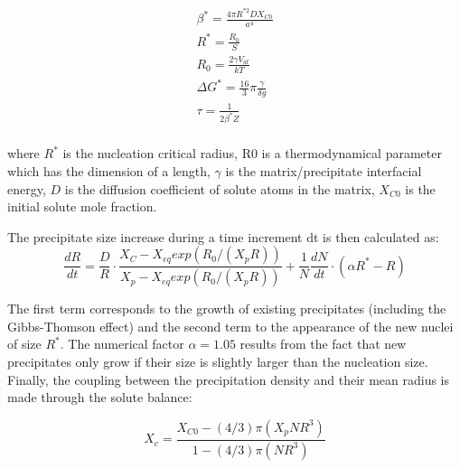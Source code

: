 \documentclass[12pt,a4paper]{article}
\begin{document}
\begin{subequations}
	\begin{align}
\beta^* = \frac{4\pi R^{*2} D X_{C0}}{a^4} \\
R^* = \frac{R_0}{S} \\
R_0 = \frac{2\gamma V_{at}}{kT} \\
\Delta G^* = \frac{16}{3}\pi \frac{\gamma}{\delta g} \\
\tau = \frac{1}{2\beta^* Z} \\
	\end{align}
	
\end{subequations}

where $R^*$ is the nucleation critical radius, R0 is a thermodynamical parameter
which has the dimension of a length, $\gamma$ is the matrix/precipitate interfacial energy, $D$ is the diffusion coefficient of solute atoms in the matrix, $X_{C0}$ is the initial solute mole fraction.

The precipitate size increase during a time increment dt is then calculated as:
\begin{equation}
\frac{dR}{dt} = \frac{D}{R} \cdot \frac{X_C - X_{eq} exp(R_0/(X_pR))}{X_p - X_{eq} exp(R_0/(X_pR))} + \frac{1}{N}\frac{dN}{dt} \cdot (\alpha R^* - R)
\end{equation}

The first term corresponds to the growth of existing precipitates (including the Gibbs-Thomson effect) and the second term to the appearance of the new nuclei of
size $R^*$. The numerical factor $\alpha = 1.05$ results from the fact that new precipitates only grow if their size is slightly larger than the nucleation size. 
Finally, the coupling between the precipitation density and their mean radius is made through the solute balance:

\begin{equation}
X_c = \frac{X_{C0}-(4/3)\pi (X_pNR^3)}{1-(4/3)\pi (NR^3)}
\end{equation}



\end{document}
